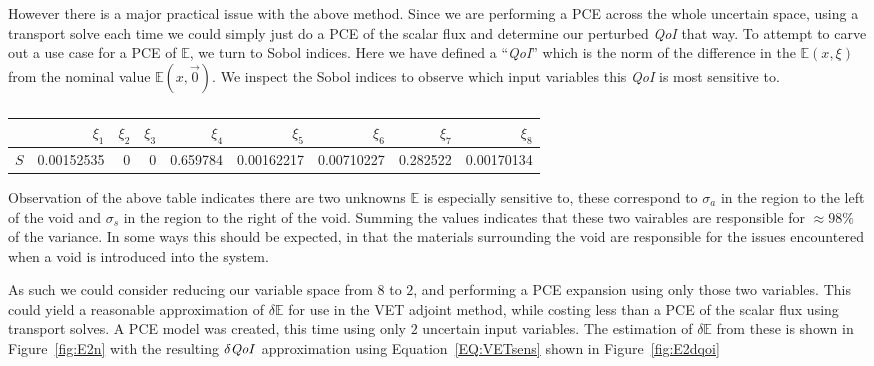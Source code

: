 \documentclass{article}
\newcommand{\Edd}{\mathbb{E}}
\newcommand{\sigs}{\sigma_s}
\newcommand{\siga}{\sigma_a}
\newcommand{\qoi}{{\it QoI}\xspace}
\begin{document}

However there is a major practical issue with the above method. Since we are performing a PCE across the whole uncertain space, using a transport solve each time we could simply just do a PCE of the scalar flux and determine our perturbed \qoi that way. To attempt to carve out a use case for a PCE of $\Edd$, we turn to Sobol indices. Here we have defined a ``\qoi'' which is the norm of the difference in the $\Edd(x,\xi)$ from the nominal value $\Edd(x,\vec{0})$. We inspect the Sobol indices to observe which input variables this \qoi is most sensitive to.
\begin{table}[H]
\footnotesize
\centering
  \begin{tabular}{| l | r | r | r | r | r | r | r | r |}
    \hline
  & $\xi_1$ & $\xi_2$ & $\xi_3$ & $\xi_4$ & $\xi_5$ & $\xi_6$ & $\xi_7$ & $\xi_8$ \\ \hline
$S$ & 0.00152535 & 0 & 0 & 0.659784 & 0.00162217 & 0.00710227 & 0.282522 & 0.00170134 \\  \hline
    \end{tabular}
  \caption{}
\end{table}
Observation of the above table indicates there are two unknowns $\Edd$ is especially sensitive to, these correspond to $\siga$ in the region to the left of the void and $\sigs$ in the region to the right of the void. Summing the values indicates that these two vairables are responsible for $\approx 98 \%$ of the variance. In some ways this should be expected, in that the materials surrounding the void are responsible for the issues encountered when a void is introduced into the system.

As such we could consider reducing our variable space from $8$ to $2$, and performing a PCE expansion using only those two variables. This could yield a reasonable approximation of $\delta \Edd$ for use in the VET adjoint method, while costing less than a PCE of the scalar flux using transport solves. A PCE model was created, this time using only $2$ uncertain input variables. The estimation of $\delta \Edd$ from these is shown in Figure~\ref{fig:E2n} with the resulting $\delta \qoi$ approximation using Equation~\ref{EQ:VETsens} shown in Figure~\ref{fig:E2dqoi}
\end{document}

